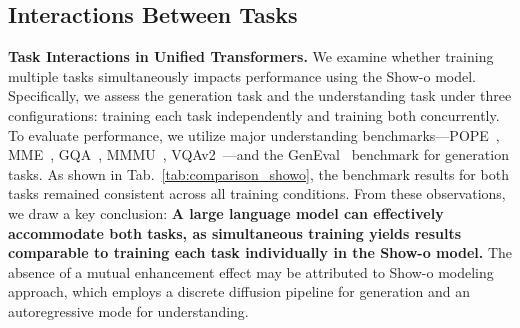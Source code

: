 % 






\subsection{Interactions Between Tasks}
\label{sec:SH_gumbel}




\textbf{Task Interactions in Unified Transformers.} We examine whether training multiple tasks simultaneously impacts performance using the Show-o model. Specifically, we assess the generation task and the understanding task under three configurations: training each task independently and training both concurrently. To evaluate performance, we utilize major understanding benchmarks—POPE~\cite{pope}, MME~\cite{mme}, GQA~\cite{gqa}, MMMU~\cite{mmmu}, VQAv2~\cite{vqav2}—and the GenEval~\cite{geneval} benchmark for generation tasks. As shown in Tab.~\ref{tab:comparison_showo}, the benchmark results for both tasks remained consistent across all training conditions. From these observations, we draw a key conclusion: \textbf{A large language model can effectively accommodate both tasks, as simultaneous training yields results comparable to training each task individually in the Show-o model.} The absence of a mutual enhancement effect may be attributed to Show-o modeling approach, which employs a discrete diffusion pipeline for generation and an autoregressive mode for understanding. 




